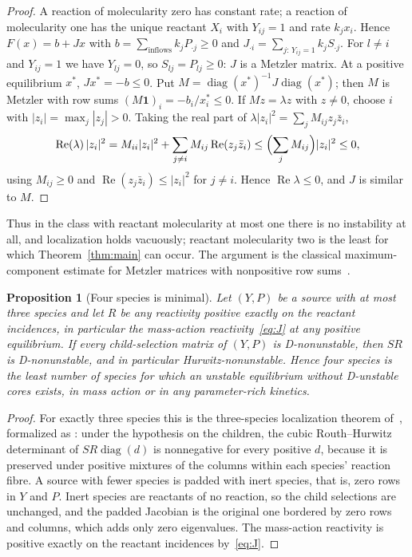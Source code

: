 \documentclass[11pt,a4paper]{article}
\theoremstyle{plain}
\newtheorem{proposition}[theorem]{Proposition}
\theoremstyle{definition}
\theoremstyle{remark}
\newcommand{\diag}{\operatorname{diag}}
\newcommand{\Real}{\operatorname{Re}}
\newcommand{\xs}{x^{*}}
\begin{document}
\begin{proof}
A reaction of molecularity zero has constant rate; a reaction of molecularity one has the unique reactant $X_i$ with $Y_{ij}=1$ and rate $k_jx_i$. Hence $F(x)=b+Jx$ with $b=\sum_{\text{inflows}}k_jP_{\cdot j}\ge0$ and $J_{\cdot i}=\sum_{j:\,Y_{ij}=1}k_jS_{\cdot j}$. For $l\ne i$ and $Y_{ij}=1$ we have $Y_{lj}=0$, so $S_{lj}=P_{lj}\ge0$: $J$ is a Metzler matrix. At a positive equilibrium $\xs$, $J\xs=-b\le0$. Put $M=\diag(\xs)^{-1}J\diag(\xs)$; then $M$ is Metzler with row sums $(M\mathbf 1)_i=-b_i/x^*_i\le0$. If $Mz=\lambda z$ with $z\ne0$, choose $i$ with $|z_i|=\max_j|z_j|>0$. Taking the real part of $\lambda|z_i|^2=\sum_jM_{ij}z_j\bar z_i$,
\[
\Real(\lambda)\,|z_i|^2=M_{ii}|z_i|^2+\sum_{j\ne i}M_{ij}\Real(z_j\bar z_i)\le\Bigl(\sum_jM_{ij}\Bigr)|z_i|^2\le0 ,
\]
using $M_{ij}\ge0$ and $\Real(z_j\bar z_i)\le|z_i|^2$ for $j\ne i$. Hence $\Real\lambda\le0$, and $J$ is similar to $M$.
\end{proof}

Thus in the class with reactant molecularity at most one there is no instability at all, and localization holds vacuously; reactant molecularity two is the least for which Theorem~\ref{thm:main} can occur. The argument is the classical maximum-component estimate for Metzler matrices with nonpositive row sums~\cite{BermanPlemmons1994}.

\begin{proposition}[Four species is minimal]\label{prop:species}
Let $(Y,P)$ be a source with at most three species and let $R$ be any reactivity positive exactly on the reactant incidences, in particular the mass-action reactivity~\eqref{eq:J} at any positive equilibrium. If every child-selection matrix of $(Y,P)$ is D-nonunstable, then $SR$ is D-nonunstable, and in particular Hurwitz-nonunstable. Hence four species is the least number of species for which an unstable equilibrium without D-unstable cores exists, in mass action or in any parameter-rich kinetics.
\end{proposition}

\begin{proof}
For exactly three species this is the three-species localization theorem of~\cite{ParameterRich2026}, formalized as : under the hypothesis on the children, the cubic Routh--Hurwitz determinant of $SR\diag(d)$ is nonnegative for every positive $d$, because it is preserved under positive mixtures of the columns within each species' reaction fibre. A source with fewer species is padded with inert species, that is, zero rows in $Y$ and $P$. Inert species are reactants of no reaction, so the child selections are unchanged, and the padded Jacobian is the original one bordered by zero rows and columns, which adds only zero eigenvalues. The mass-action reactivity is positive exactly on the reactant incidences by~\eqref{eq:J}.
\end{proof}
\end{document}

